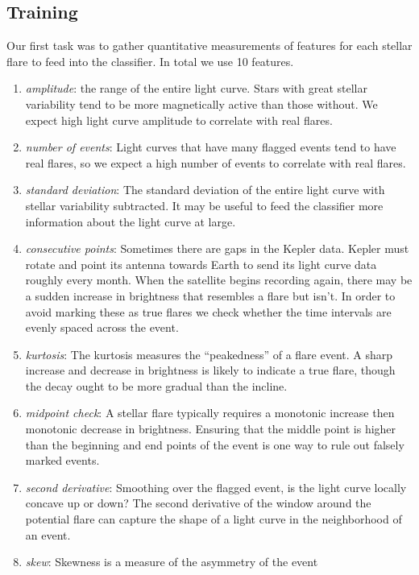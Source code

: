 \documentclass[11pt]{article}
\begin{document}
\subsection{Training}
\label{sec:train}
Our first task was to gather quantitative measurements of features for
each stellar flare to feed into the classifier.  In total we use 10
features.
\begin{enumerate}[(1)]
\item \emph{amplitude}: the range of the entire light curve.  Stars
  with great stellar variability tend to be more magnetically active
  than those without.  We expect high light curve amplitude to
  correlate with real flares.
\item \emph{number of events}: Light curves that have many flagged
  events tend to have real flares, so we expect a high number of
  events to correlate with real flares.
\item \emph{standard deviation}: The standard deviation of the entire
  light curve with stellar variability subtracted.  It may be useful
  to feed the classifier more information about the light curve at
  large.
\item \emph{consecutive points}: Sometimes there are gaps in the
  Kepler data.  Kepler must rotate and point its antenna towards Earth
  to send its light curve data roughly every month.  When the
  satellite begins recording again, there may be a sudden increase in
  brightness that resembles a flare but isn't.  In order to avoid
  marking these as true flares we check whether the time intervals are
  evenly spaced across the event.
\item \emph{kurtosis}: The kurtosis measures the ``peakedness'' of a
  flare event.  A sharp increase and decrease in brightness is likely
  to indicate a true flare, though the decay ought to be more gradual
  than the incline.
\item \emph{midpoint check}: A stellar flare typically requires a
  monotonic increase then monotonic decrease in brightness.  Ensuring
  that the middle point is higher than the beginning and end points of
  the event is one way to rule out falsely marked events.
\item \emph{second derivative}: Smoothing over the flagged event, is
  the light curve locally concave up or down?  The second derivative
  of the window around the potential flare can capture the shape of a
  light curve in the neighborhood of an event.
\item \emph{skew}: Skewness is a measure of the asymmetry of the event

\end{enumerate}
\end{document}
